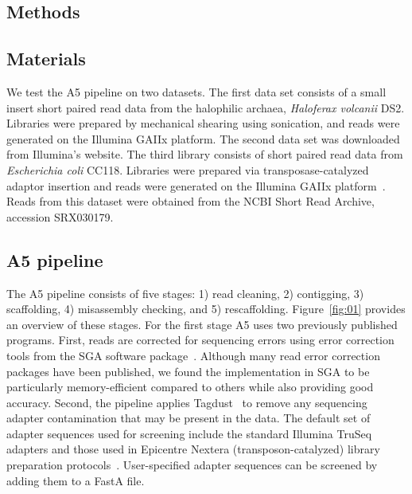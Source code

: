 \documentclass{bioinfo}
\begin{document}
\begin{methods}
\section{Methods}
\subsection{Materials}

We test the A5 pipeline on two datasets. The first data set consists of a small insert 
short paired read data from the halophilic archaea, \emph{Haloferax volcanii} DS2. Libraries
were prepared by mechanical shearing using sonication, and reads were generated on
the Illumina GAIIx platform. The second data set was downloaded from Illumina's website. 
The third library consists of short paired read data from \emph{Escherichia 
coli} CC118. Libraries were prepared via transposase-catalyzed adaptor insertion and reads 
were generated on the Illumina GAIIx platform~\citep{Adey2010}. Reads from this dataset were obtained from
the NCBI Short Read Archive, accession SRX030179.

\subsection{A5 pipeline}

The A5 pipeline consists of five stages: 1) read cleaning, 2) contigging, 3) scaffolding,
4) misassembly checking, and 5) rescaffolding. Figure~\ref{fig:01} provides an overview of these stages. 
For the first stage A5 uses two previously
published programs. First, reads are corrected for sequencing errors using error correction tools 
from the SGA software package~\citep{Simpson2010}.  Although many read error correction packages have been published,
we found the implementation in SGA to be particularly memory-efficient compared to others while also providing 
good accuracy.  Second, the pipeline applies Tagdust~\citep{Lassmann2009} to remove any 
sequencing adapter contamination that may be present in the data. The default set of adapter sequences used for screening
include the standard Illumina TruSeq adapters and those used in Epicentre Nextera (transposon-catalyzed) library preparation protocols~\citep{Adey2010}. 
User-specified adapter sequences can be screened by adding them to a FastA file. 


\end{methods}
\end{document}

